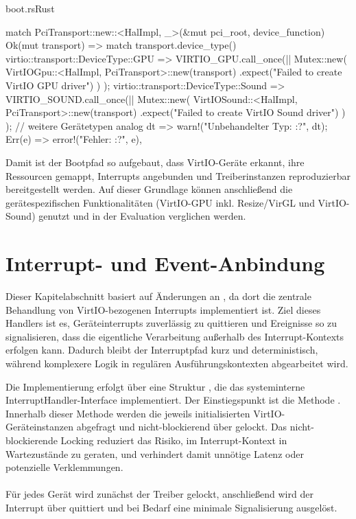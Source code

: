 \begin{codeblock}{boot.rs}{Rust}
  \begin{rustcode}
match PciTransport::new::<HalImpl, _>(&mut pci_root, device_function) {
    Ok(mut transport) => {
        match transport.device_type() {
            virtio::transport::DeviceType::GPU => {
                VIRTIO_GPU.call_once(|| {
                    Mutex::new(
                        VirtIOGpu::<HalImpl, PciTransport>::new(transport)
                            .expect("Failed to create VirtIO GPU driver")
                    )
                });
            }
            virtio::transport::DeviceType::Sound => {
                VIRTIO_SOUND.call_once(|| {
                    Mutex::new(
                        VirtIOSound::<HalImpl, PciTransport>::new(transport)
                            .expect("Failed to create VirtIO Sound driver")
                    )
                });
            }
            // weitere Gerätetypen analog
            dt => {
                warn!("Unbehandelter Typ: {:?}", dt);
            }
        }
    }
    Err(e) => error!("Fehler: {:?}", e),
}
  \end{rustcode}
\end{codeblock}

Damit ist der Bootpfad so aufgebaut, dass VirtIO-Geräte erkannt, ihre Ressourcen gemappt, Interrupts angebunden und Treiberinstanzen reproduzierbar bereitgestellt werden. Auf dieser Grundlage können anschließend die gerätespezifischen Funktionalitäten (VirtIO-GPU inkl. Resize/VirGL und VirtIO-Sound) genutzt und in der Evaluation verglichen werden.

\section{Interrupt- und Event-Anbindung}

Dieser Kapitelabschnitt basiert auf Änderungen an , da dort die zentrale Behandlung von VirtIO-bezogenen Interrupts implementiert ist. Ziel dieses Handlers ist es, Geräteinterrupts zuverlässig zu quittieren und Ereignisse so zu signalisieren, dass die eigentliche Verarbeitung außerhalb des Interrupt-Kontexts erfolgen kann. Dadurch bleibt der Interruptpfad kurz und deterministisch, während komplexere Logik in regulären Ausführungskontexten abgearbeitet wird.

Die Implementierung erfolgt über eine Struktur , die das systeminterne InterruptHandler-Interface implementiert. Der Einstiegspunkt ist die Methode . Innerhalb dieser Methode werden die jeweils initialisierten Virt\-IO-Ge\-rä\-te\-in\-stan\-zen abgefragt und nicht-blockierend über  gelockt. Das nicht-blockierende Locking reduziert das Risiko, im Interrupt-Kontext in Wartezustände zu geraten, und verhindert damit unnötige Latenz oder potenzielle Verklemmungen.\\
\\
Für jedes Gerät wird zunächst der Treiber gelockt, anschließend wird der Interrupt über  quittiert und bei Bedarf eine minimale Signalisierung ausgelöst.

